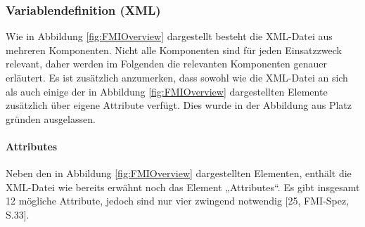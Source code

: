 \subsubsection{Variablendefinition (XML)}\label{sec:Variablendefinition}
Wie in Abbildung \ref{fig:FMIOverview} dargestellt besteht die XML-Datei aus mehreren Komponenten. Nicht alle Komponenten sind für jeden Einsatzzweck relevant, daher werden im Folgenden die relevanten Komponenten genauer erläutert.
\newline
Es ist zusätzlich anzumerken, dass sowohl wie die XML-Datei an sich als auch einige der in Abbildung \ref{fig:FMIOverview} dargestellten Elemente zusätzlich über eigene Attribute verfügt. Dies wurde in der Abbildung aus Platz gründen ausgelassen.

\paragraph{Attributes}\label{sec:AttributeFMU}
\noindent Neben den in Abbildung \ref{fig:FMIOverview} dargestellten Elementen, enthält die XML-Datei wie bereits erwähnt noch das Element „Attributes“. Es gibt insgesamt 12 mögliche Attribute, jedoch sind nur vier zwingend notwendig [25, FMI-Spez, S.33].
